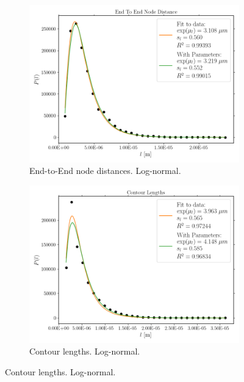 \begin{figure}[H]
\begin{subfigure}{0.5\textwidth}
    \label{subfig:actin_cosines}
  \end{subfigure}\\[1ex]
  \begin{subfigure}{0.5\textwidth}
    \centering
    \includegraphics[width=0.99\linewidth]{Figures/chapter-image/pipeline_screenshots/actin_ete_distance_tile4_c_m_iPA_iShort1_bins30.png}
    \caption{End-to-End node distances. Log-normal.}
    \label{subfig:actin_ete}
  \end{subfigure}%
  \begin{subfigure}{0.5\textwidth}
    \centering
  \includegraphics[width=0.99\linewidth]{Figures/chapter-image/pipeline_screenshots/actin_contour_length_tile4_c_m_iPA_iShort1_bins30.png}
    \caption{Contour lengths. Log-normal.}

\end{subfigure}
\end{figure}
